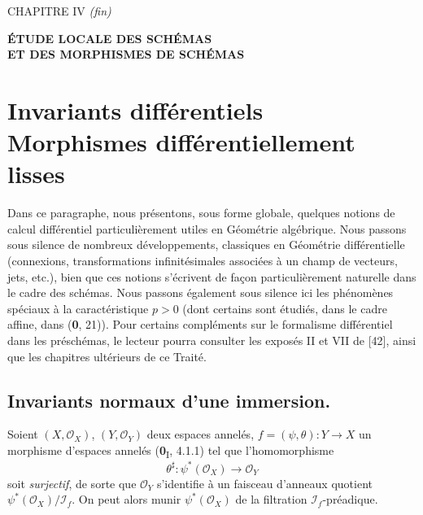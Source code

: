 \clearpage
\thispagestyle{plain}
\label{chapter:IV4-fr}

\begin{center}
{\large CHAPITRE IV \textit{(fin)}\par}
\vspace{1.5em}
{\Large\bfseries ÉTUDE LOCALE DES SCHÉMAS\\
ET DES MORPHISMES DE SCHÉMAS\par}
\end{center}

\section{Invariants différentiels\texorpdfstring{\\}{.} Morphismes différentiellement lisses}
\label{section:IV.16}

Dans ce paragraphe, nous présentons, sous forme globale, quelques notions de
calcul différentiel particulièrement utiles en Géométrie algébrique. Nous passons sous
silence de nombreux développements, classiques en Géométrie différentielle (connexions,
transformations infinitésimales associées à un champ de vecteurs, jets, etc.), bien que ces
notions s'écrivent de façon particulièrement naturelle dans le cadre des schémas. Nous
passons également sous silence ici les phénomènes spéciaux à la caractéristique $p>0$
(dont certains sont étudiés, dans le cadre affine, dans (\textbf{0}, 21)). Pour certains compléments
sur le formalisme différentiel dans les préschémas, le lecteur pourra consulter les
exposés II et VII de [42], ainsi que les chapitres ultérieurs de ce Traité.

\subsection{Invariants normaux d'une immersion.}

\begin{env}[16.1.1]
\label{IV.16.1.1}
Soient $(X,\mathcal{O}_X)$, $(Y,\mathcal{O}_Y)$ deux espaces annelés,
$f=(\psi,\theta):Y\to X$ un morphisme d'espaces annelés (\textbf{0}\textsubscript{I}, 4.1.1)
tel que l'homomorphisme
\[
  \theta^\sharp:\psi^*(\mathcal{O}_X)\longrightarrow\mathcal{O}_Y
\]
soit \emph{surjectif}, de sorte que $\mathcal{O}_Y$ s'identifie à un faisceau d'anneaux quotient
$\psi^*(\mathcal{O}_X)/\mathscr{I}_f$. On peut alors munir
$\psi^*(\mathcal{O}_X)$ de la filtration $\mathscr{I}_f$-préadique.
\end{env}

